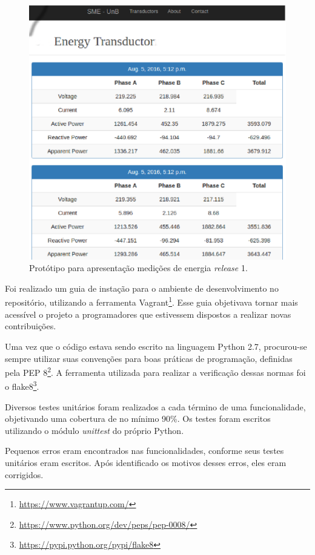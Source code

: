 \begin{figure}[!htb]
    \centering
    \includegraphics[keepaspectratio=true,scale=0.5]{figuras/coleta_dados_01.eps}
    \caption{Protótipo para apresentação medições de energia \textit{release} 1.}
    \label{dados01}
\end{figure}

Foi realizado um guia de instação para o ambiente de desenvolvimento no repositório, utilizando a ferramenta Vagrant\footnote{\url{https://www.vagrantup.com/}}. Esse guia objetivava tornar mais acessível o projeto a programadores que estivessem dispostos a realizar novas contribuições.

Uma vez que o código estava sendo escrito na linguagem Python 2.7, procurou-se sempre utilizar suas convenções para boas práticas de programação, definidas pela PEP 8\footnote{\url{https://www.python.org/dev/peps/pep-0008/}}. A ferramenta utilizada para realizar a verificação dessas normas foi o flake8\footnote{\url{https://pypi.python.org/pypi/flake8}}.

Diversos testes unitários foram realizados a cada término de uma funcionalidade, objetivando uma cobertura de no mínimo 90\%. Os testes foram escritos utilizando o módulo \textit{unittest} do próprio Python.

Pequenos erros eram encontrados nas funcionalidades, conforme seus testes unitários eram escritos. Após identificado os motivos desses erros, eles eram corrigidos.

